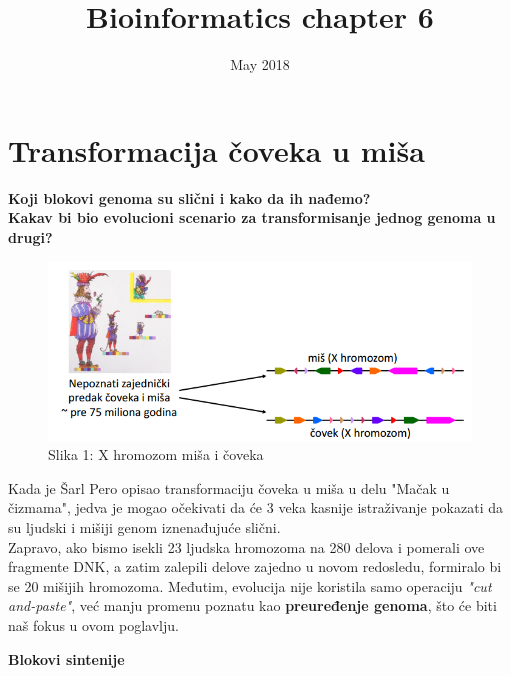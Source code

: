 \documentclass{article}
\title{Bioinformatics chapter 6}
\author{}
\date{May 2018}
\begin{document}
\maketitle
\newpage

\section{Transformacija čoveka u miša}

\vspace{0.5cm}

\noindent \textbf{Koji blokovi genoma su slični i kako da ih
nađemo?}\\

\noindent \textbf{Kakav bi bio evolucioni scenario za
transformisanje jednog genoma u drugi?}\\

\begin{figure}[h!]
\includegraphics[scale=0.7]{slike/predak_X.PNG}
\caption{Slika 1: X hromozom miša i čoveka}
\label{slika:X}
\end{figure}

Kada je Šarl Pero opisao transformaciju čoveka u miša u delu "Mačak u čizmama", jedva je mogao očekivati da će 3 veka kasnije istraživanje pokazati da su ljudski i mišiji genom iznenađujuće slični.\\

Zapravo, ako bismo isekli 23 ljudska hromozoma na 280 delova i pomerali ove fragmente DNK, a zatim zalepili delove zajedno u novom redosledu, formiralo bi se 20 mišijih hromozoma. Međutim, evolucija nije koristila samo operaciju \textit{"cut and-paste"}, već manju promenu poznatu kao \textbf{preuređenje genoma}, što će biti naš  fokus u ovom poglavlju.\\

\newpage

\hspace{4cm}\large{\textbf{Blokovi sintenije}}\\
\end{document}
